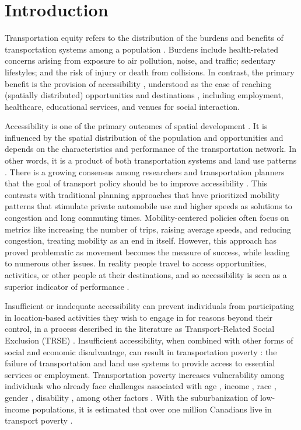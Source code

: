 \documentclass[preprint, 3p,
authoryear]{elsarticle} %
\begin{document}
\section{Introduction}\label{introduction}

Transportation equity refers to the distribution of the burdens and
benefits of transportation systems among a population
\citep{karner2020, pereira2017}. Burdens include health-related concerns
arising from exposure to air pollution, noise, and traffic; sedentary
lifestyles; and the risk of injury or death from collisions. In
contrast, the primary benefit is the provision of accessibility
\citep{pereira2021}, understood as the ease of reaching (spatially
distributed) opportunities and destinations
\citep{páez2012, hansen1959, soukhov2025}, including employment,
healthcare, educational services, and venues for social interaction.

Accessibility is one of the primary outcomes of spatial development
\citep{páez2012}. It is influenced by the spatial distribution of the
population and opportunities and depends on the characteristics and
performance of the transportation network. In other words, it is a
product of both transportation systems and land use patterns
\citep{wee2011}. There is a growing consensus among researchers and
transportation planners that the goal of transport policy should be to
improve accessibility \citep{el-geneidy2022, boisjoly2017}. This
contrasts with traditional planning approaches that have prioritized
mobility patterns that stimulate private automobile use and higher
speeds as solutions to congestion and long commuting times.
Mobility-centered policies often focus on metrics like increasing the
number of trips, raising average speeds, and reducing congestion,
treating mobility as an end in itself. However, this approach has proved
problematic as movement becomes the measure of success, while leading to
numerous other issues. In reality people travel to access opportunities,
activities, or other people at their destinations, and so accessibility
is seen as a superior indicator of performance \citep{pereira2023}.

Insufficient or inadequate accessibility can prevent individuals from
participating in location-based activities they wish to engage in for
reasons beyond their control, in a process described in the literature
as Transport-Related Social Exclusion (TRSE)
\citep{litman2024, lucas2012, preston2007, luz2022, paez2009mobility}.
Insufficient accessibility, when combined with other forms of social and
economic disadvantage, can result in transportation poverty
\citep{lucas2019, luz2022}: the failure of transportation and land use
systems to provide access to essential services or employment.
Transportation poverty increases vulnerability among individuals who
already face challenges associated with age \citep{vandülmen2022},
income \citep{allen2019}, race \citep{awaworyichurchill2020}, gender
\citep{murphy2023}, disability \citep{upham2022}, among other factors
\citep{kim2024}. With the suburbanization of low-income populations, it
is estimated that over one million Canadians live in transport poverty
\citep{allen2019}.
\end{document}
